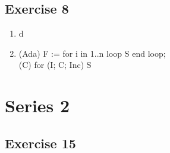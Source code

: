 \documentclass[12pt,fleqn]{article}		%
\begin{document}
\subsection{Exercise 8}
\begin{enumerate}
\item d
\item (Ada) F := for i in 1..n loop S end loop; \\
(C) for (I; C; Inc) { S }
\end{enumerate}

\section{Series 2}
\subsection{Exercise 15}
\end{document}
